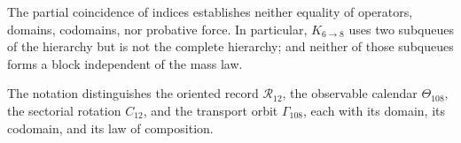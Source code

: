 The partial coincidence of indices establishes neither equality of operators,
domains, codomains, nor probative force. In particular,
\(K_{6\to8}\) uses two subqueues of the hierarchy but is not the complete
hierarchy; and neither of those subqueues forms a block independent of the mass
law.

\begin{remark}
The notation distinguishes the oriented record \(\mathcal R_{12}\), the
observable calendar \(\Theta_{108}\), the sectorial rotation \(C_{12}\), and
the transport orbit \(\Gamma_{108}\), each with its domain, its
codomain, and its law of composition.
\end{remark}
